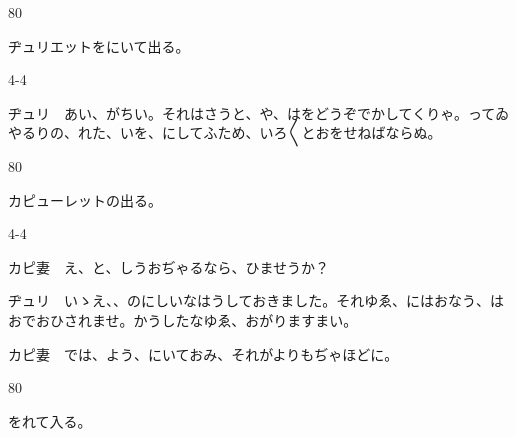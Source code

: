 \documentclass[tate,paper=b6j,jafontsize=9pt]{jlreq}
\begin{document}
\begin{azconvIndented}{8\zw}{0\zw}

ヂュリエットをにいて出る。

\end{azconvIndented}
\begin{azconvIndented}{4\zw}{-4\zw}

ヂュリ　あい、がちい。それはさうと、や、はをどうぞでかしてくりゃ。ってゐやるりの、れた、いを、にしてふため、いろ{〳〵}とおをせねばならぬ。

\end{azconvIndented}
\begin{azconvIndented}{8\zw}{0\zw}

カピューレットの出る。

\end{azconvIndented}
\begin{azconvIndented}{4\zw}{-4\zw}

カピ妻　え、と、しうおぢゃるなら、ひませうか？

ヂュリ　いゝえ、、のにしいなはうしておきました。それゆゑ、にはおなう、はおでおひされませ。かうしたなゆゑ、おがりますまい。

カピ妻　では、よう、にいておみ、それがよりもぢゃほどに。

\end{azconvIndented}
\begin{azconvIndented}{8\zw}{0\zw}

をれて入る。

\end{azconvIndented}
\end{document}
